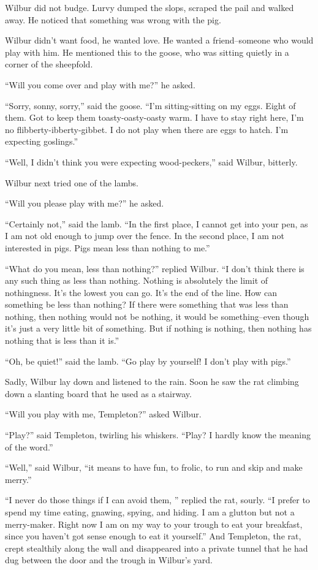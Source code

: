 \documentclass[a4paper, oneside]{book}
\begin{document}
 Wilbur did not budge. Lurvy dumped the slops, scraped the pail 
and walked away. He noticed that something was wrong with the
pig. 

 Wilbur didn't want food, he wanted love. He wanted a
friend--someone who would play with him. He mentioned this to
the goose, who was sitting quietly in a corner of the sheepfold.

 ``Will you come over and play with me?'' he asked.
 
 ``Sorry, sonny, sorry,'' said the goose. ``I'm sitting-sitting on my
eggs. Eight of them. Got to keep them toasty-oasty-oasty warm. I
have to stay right here, I'm no flibberty-ibberty-gibbet. I do not
play when there are eggs to hatch. I'm expecting goslings.''

 ``Well, I didn't think you were expecting wood-peckers,'' said
Wilbur, bitterly.

 Wilbur next tried one of the lambs.
 
 ``Will you please play with me?'' he asked.
 
 ``Certainly not,'' said the lamb. ``In the first place, I cannot get into
your pen, as I am not old enough to jump over the fence. In the
second place, I am not interested in pigs. Pigs mean less than
nothing to me.'' 

 ``What do you mean, less than nothing?'' replied Wilbur. ``I don't
think there is any such thing as less than nothing. Nothing is
absolutely the limit of nothingness. It's the lowest you can go. It's
the end of the line. How can something be less than nothing? If 
there were something that was less than nothing, then nothing
would not be nothing, it would be something--even though it's just
a very little bit of something. But if nothing is nothing, then
nothing has nothing that is less than it is.''

 ``Oh, be quiet!'' said the lamb. ``Go play by yourself! I don't play
with pigs.''

Sadly, Wilbur lay down and listened to the rain. Soon he saw the
rat climbing down a slanting board that he used as a stairway.

 ``Will you play with me, Templeton?'' asked Wilbur.
 
 ``Play?'' said Templeton, twirling his whiskers. ``Play? I hardly
know the meaning of the word.''

 ``Well,'' said Wilbur, ``it means to have fun, to frolic, to run and
skip and make merry.'' 

 ``I never do those things if I can avoid them, '' replied the rat,
sourly. ``I prefer to spend my time eating, gnawing, spying, and
hiding. I am a glutton but not a merry-maker. Right now I am on
my way to your trough to eat your breakfast, since you haven't got
sense enough to eat it yourself.'' And Templeton, the rat, crept
stealthily along the wall and disappeared into a private tunnel that
he had dug between the door and the trough in Wilbur's yard.
\end{document}
